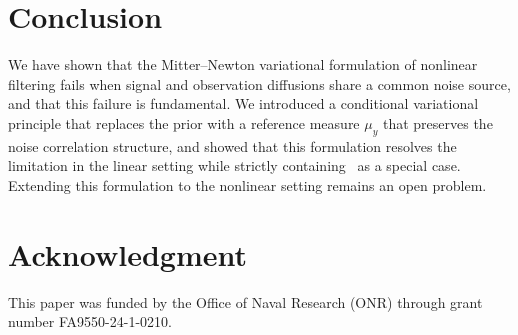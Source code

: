 \documentclass[12pt]{amsart}
\theoremstyle{definition}
\theoremstyle{remark}
\begin{document}
\section{Conclusion}
We have shown that the Mitter--Newton variational formulation of nonlinear filtering fails when signal and observation diffusions share a common noise source, and that this failure is fundamental. We introduced a conditional variational principle that replaces the prior with a reference measure $\mu_y$
that preserves the noise correlation structure, and showed that this formulation resolves the limitation in the linear setting while strictly containing~\cite{mitter2003variational} as a special case. Extending this formulation to the nonlinear setting remains an open problem.

\section*{Acknowledgment}
This paper was funded by the Office of Naval Research (ONR) through grant number FA9550-24-1-0210.



\end{document}
